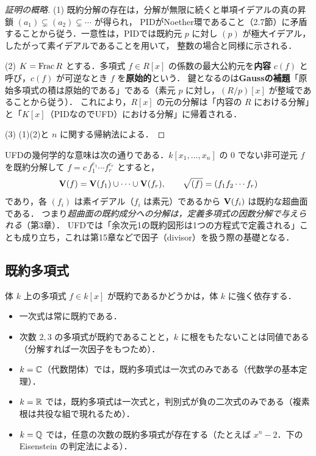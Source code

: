 \begin{proof}[証明の概略]
(1) 既約分解の存在は，分解が無限に続くと単項イデアルの真の昇鎖 $(a_1)\subsetneq(a_2)\subsetneq\cdots$ が得られ，
PIDがNoether環であること（2.7節）に矛盾することから従う．一意性は，PIDでは既約元 $p$ に対し $(p)$ が極大イデアル，したがって素イデアルであることを用いて，
整数の場合と同様に示される．

(2) $K=\operatorname{Frac} R$ とする．多項式 $f\in R[x]$ の係数の最大公約元を\textbf{内容} $c(f)$ と呼び，$c(f)$ が可逆なとき $f$ を\textbf{原始的}という．
鍵となるのは\textbf{Gaussの補題}「原始多項式の積は原始的である」である（素元 $p$ に対し，$(R/p)[x]$ が整域であることから従う）．
これにより，$R[x]$ の元の分解は「内容の $R$ における分解」と「$K[x]$（PIDなのでUFD）における分解」に帰着される．

(3) (1)(2)と $n$ に関する帰納法による．
\end{proof}

UFDの幾何学的な意味は次の通りである．$k[x_1,\dots,x_n]$ の $0$ でない非可逆元 $f$ を既約分解して $f=c\,f_1^{e_1}\cdots f_r^{e_r}$ とすると，
\[
  \mathbf{V}(f)=\mathbf{V}(f_1)\cup\dots\cup\mathbf{V}(f_r),\qquad \sqrt{(f)}=(f_1f_2\cdots f_r)
\]
であり，各 $(f_i)$ は素イデアル（$f_i$ は素元）であるから $\mathbf{V}(f_i)$ は既約な超曲面である．
つまり\emph{超曲面の既約成分への分解は，定義多項式の因数分解で与えられる}（第3章）．
UFDでは「余次元1の既約図形は1つの方程式で定義される」ことも成り立ち，これは第15章などで因子（divisor）を扱う際の基礎となる．

\subsection{既約多項式}

体 $k$ 上の多項式 $f\in k[x]$ が既約であるかどうかは，体 $k$ に強く依存する．
\begin{itemize}
  \item 一次式は常に既約である．
  \item 次数 $2,3$ の多項式が既約であることと，$k$ に根をもたないことは同値である（分解すれば一次因子をもつため）．
  \item $k=\mathbb{C}$（代数閉体）では，既約多項式は一次式のみである（代数学の基本定理）．
  \item $k=\mathbb{R}$ では，既約多項式は一次式と，判別式が負の二次式のみである（複素根は共役な組で現れるため）．
  \item $k=\mathbb{Q}$ では，任意の次数の既約多項式が存在する（たとえば $x^n-2$．下の Eisenstein の判定法による）．
\end{itemize}

